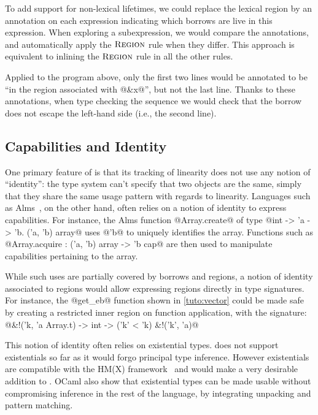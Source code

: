 To add support for non-lexical lifetimes, we could replace the
lexical region by an annotation on each expression indicating which borrows are
live in this expression.
When exploring a subexpression, we would compare the annotations, and automatically
apply the $\textsc{Region}$ rule when they differ.
%
This approach is equivalent to inlining the $\textsc{Region}$ rule in all the other
rules.

Applied to the program above, only the first two lines would be annotated
to be ``in the region associated with @&x@'', but not the last line.
Thanks to these annotations, when type checking the sequence we would check
that the borrow does not escape the left-hand side (i.e., the second line).

\subsection{Capabilities and Identity}

One primary feature of \lang is that its tracking of linearity does
not use any notion of ``identity'': the type system can't specify that two
objects are the same, simply that they share the same usage pattern with
regards to linearity.
Languages such as Alms~\citep{DBLP:conf/popl/TovP11}, on the other hand,
often relies on a notion of identity to express capabilities.
For instance, the Alms function
@Array.create@ of type @int -> 'a -> \E 'b. ('a, 'b) array@ uses
@'b@ to uniquely identifies the array.
Functions such as @Array.acquire : ('a, 'b) array -> 'b cap@
are then used to manipulate capabilities pertaining to the array.

While such uses are partially covered by borrows and regions,
a notion of identity associated to regions
would allow expressing regions directly in type signatures.
For instance, the @get_eb@ function shown in
\cref{tuto:vector} could be made safe
by creating a restricted inner region on function application,
with the signature:
@&!('k, 'a Array.t) -> int -> \E ('k' < 'k) &!('k', 'a)@


This notion of identity often relies on existential types.
\lang does not support existentials so far as it would
forgo principal type inference.
However existentials
are compatible with the HM(X) framework~\citep{DBLP:conf/icfp/Simonet03}
and would make a very desirable addition to \lang. OCaml also show
that existential types can be made usable without compromising
inference in the rest of the language, by integrating unpacking
and pattern matching.

